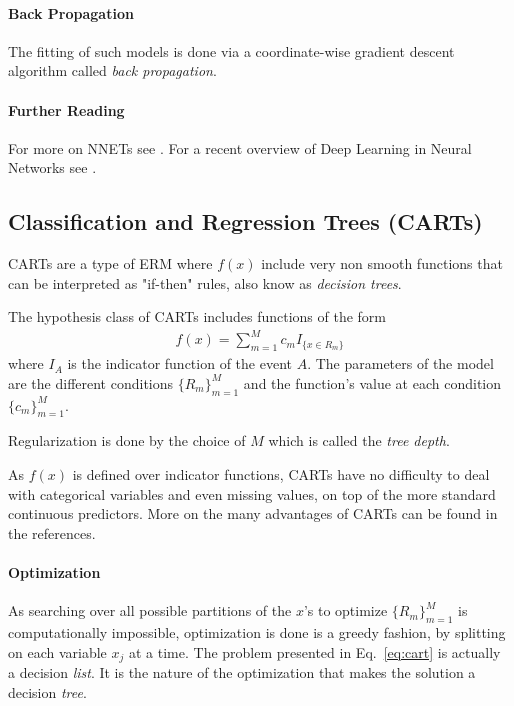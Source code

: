 \documentclass[12pt,a4paper]{article}
\theoremstyle{plain}
\theoremstyle{definition}
\newcommand{\hyp}{f}
\newcommand{\indicator}[1]{I_{\{ #1 \}}}
\begin{document}
\paragraph{Back Propagation}
The fitting of such models is done via a coordinate-wise gradient descent algorithm called \emph{back propagation}.

\paragraph{Further Reading}
For more on NNETs see \citep[Chapter 11]{hastie_elements_2003}.
For a recent overview of Deep Learning in Neural Networks see \cite{schmidhuber_deep_2015}.




\subsection{Classification and Regression Trees (CARTs)}
CARTs are a type of ERM where $\hyp(x)$ include very non smooth functions that can be interpreted as "if-then" rules, also know as \emph{decision trees}.

The hypothesis class of CARTs includes functions of the form
\begin{align}
\label{eq:cart}
	\hyp(x)=\sum_{m=1}^M c_m \indicator{x \in R_m}
\end{align}
where $I_A$ is the indicator function of the event $A$.
The parameters of the model are the different conditions $\{R_m\}_{m=1}^M$ and the function's value at each condition $\{c_m\}_{m=1}^M$. 

Regularization is done by the choice of $M$ which is called the \emph{tree depth}.

As $\hyp(x)$ is defined over indicator functions, CARTs have no difficulty to deal with categorical variables and even missing values, on top of the more standard continuous predictors. More on the many advantages of CARTs can be found in the references.

\paragraph{Optimization}
As searching over all possible partitions of the $x$'s to optimize $\{R_m\}_{m=1}^M$ is computationally impossible, optimization is done is a greedy fashion, by splitting on each variable $x_j$ at a time.
The problem presented in Eq.~\ref{eq:cart} is actually a decision \emph{list}. It is the nature of the optimization that makes the solution a decision \emph{tree}.
\end{document}
